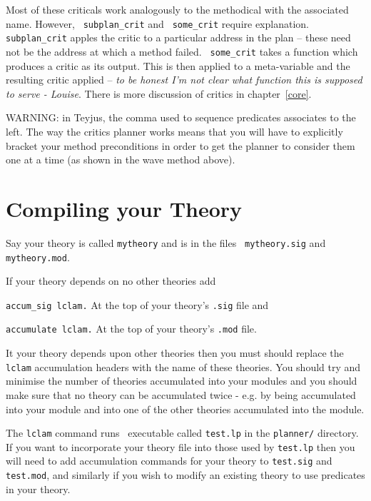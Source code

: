 Most of these criticals work analogously to the
methodical with the associated name.  However, {\tt
  subplan\_crit} and {\tt
  some\_crit} require explanation.  {\tt
  subplan\_crit} apples the critic to a particular address in the plan
-- these need not be the address at which a method failed.  {\tt
  some\_crit} takes a function which produces a critic as its output.
This is then applied to a meta-variable and the resulting critic
applied -- {\em to be honest I'm not clear what function this is
  supposed to serve - Louise}.  There is more discussion of critics in
chapter~\ref{core}.

WARNING: in Teyjus, the comma used to sequence predicates
associates to the left.  The way the critics planner works means that
you will have to explicitly bracket your method
preconditions in order to get the planner
to consider them one at a time (as shown in the wave method above).

\section{Compiling your Theory}

Say your theory is called {\tt mytheory} and is in the files {\tt
  mytheory.sig} and {\tt mytheory.mod}.  

If your theory depends on no other theories add

{\tt accum\_sig lclam.} 
At the top of your theory's {\tt .sig} file and

{\tt accumulate lclam.} 
At the top of your theory's {\tt .mod} file.

It your theory depends upon other theories then you must should
replace the {\tt lclam} accumulation headers with the name of these
theories.  You should try and minimise the number of theories
accumulated into your modules and you should make sure that no theory
can be accumulated twice - e.g. by being accumulated into your module
and into one of the other theories accumulated into the module. 

The {\tt lclam} command runs \lprolog\ executable called {\tt test.lp}
in the {\tt planner/} directory.  If you want to incorporate your
theory file into those used by {\tt test.lp} then you will need to add
accumulation commands for your theory to {\tt test.sig} and {\tt
  test.mod}, and similarly if you wish to modify an existing theory to use
predicates in your theory.

